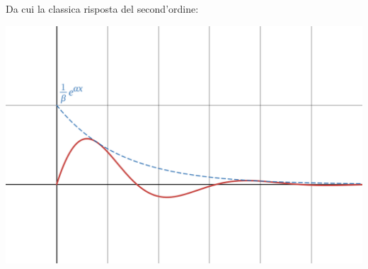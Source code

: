 \documentclass[a4paper,11pt]{article}
\begin{document}
\noindent
\begin{minipage}{\textwidth}
Da cui la classica risposta del second'ordine:
\begin{center}
	\includegraphics[scale=0.28]{../figures/suspension_second_order.png}
\end{center}
\end{minipage}
\end{document}
